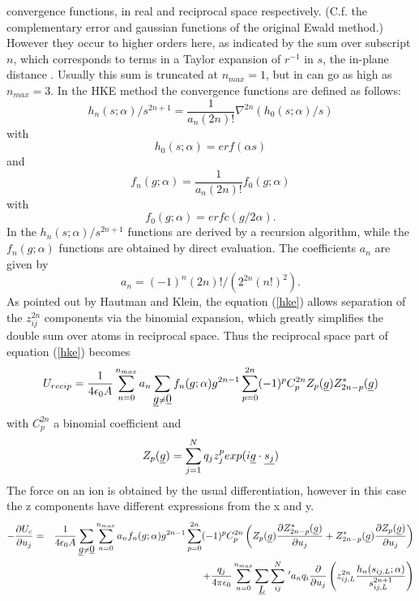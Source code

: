 convergence functions, in real and reciprocal space respectively.
(C.f. the complementary error and gaussian functions of the original
Ewald method.) However they occur to higher orders here, as indicated
by the sum over subscript $n$, which corresponds to terms in a Taylor
expansion of $r^{-1}$ in $s$, the in-plane distance
\cite{hautman-92a}. Usually this sum is truncated at $n_{max}=1$, but
in \D{} can go as high as $n_{max}=3$.  In the HKE method the
convergence functions are defined as follows:
\begin{equation}
h_{n}(s;\alpha)/s^{2n+1}=\frac{1}{a_{n}(2n)!}\nabla^{2n}(h_{0}(s;\alpha)/s)
\end{equation}
with 
\begin{equation}
h_{0}(s;\alpha)=erf(\alpha s)
\end{equation}
and
\begin{equation}
f_{n}(g;\alpha)=\frac{1}{a_{n}(2n)!}f_{0}(g;\alpha)
\end{equation}
with
\begin{equation}
f_{0}(g;\alpha)=erfc(g/2\alpha).
\end{equation}
In \D{} the $h_{n}(s;\alpha)/s^{2n+1}$ functions are derived by a
recursion algorithm, while the $f_{n}(g;\alpha)$ functions are
obtained by direct evaluation. The coefficients $a_{n}$ are given by
\begin{equation}
a_{n}=(-1)^{n}(2n)!/(2^{2n}(n!)^{2}).
\end{equation}
As pointed out by Hautman and Klein, the equation (\ref{hke}) allows
separation of the $z_{ij}^{2n}$ components via the binomial expansion,
which greatly simplifies the double sum over atoms
in reciprocal space. Thus the reciprocal space part of equation
(\ref{hke}) becomes
\begin{equation}
U_{recip}=\frac{1}{4\epsilon_{0}A}\sum_{n=0}^{n_{max}} a_{n}
\sum_{\mbox{$\underline{g}$}\ne \mbox{$\underline{0}$}} f_{n}(g;\alpha)g^{2n-1}
\sum_{p=0}^{2n}(-1)^{p}C_{p}^{2n}Z_{p}(\mbox{$\underline{g}$})Z_{2n-p}^{*}(\mbox{$\underline{g}$})
\end{equation}
with $C_{p}^{2n}$ a binomial coefficient and
\begin{equation}
Z_{p}(\mbox{$\underline{g}$})=\sum_{j=1}^{N}q_{j}z_{j}^{p}exp(i\mbox{$\underline{g}$}\cdot
\mbox{$\underline{s_{j}}$})
\end{equation}
The force on an ion is obtained by the usual differentiation, however
in this case the z components have different expressions from the x
and y.
\begin{eqnarray}
-\frac{\partial U_{c}}{\partial u_{j}} &=&
\frac{1}{4\epsilon_{0}A}\sum_{\mbox{$\underline{g}$}\ne \mbox{$\underline{0}$}} 
\sum_{n=0}^{n_{max}} a_{n}f_{n}(g;\alpha)g^{2n-1}
\sum_{p=0}^{2n}(-1)^{p}C_{p}^{2n}\left (
Z_{p}(\mbox{$\underline{g}$})\frac{\partial Z_{2n-p}^{*}(\mbox{$\underline{g}$})}{\partial u_{j}}+
Z_{2n-p}^{*}(\mbox{$\underline{g}$})\frac{\partial Z_{p}(\mbox{$\underline{g}$})}{\partial u_{j}}
\right ) \nonumber \\
 & & +\frac{q_{j}}{4\pi \epsilon_{0}}\sum_{n=0}^{n_{max}}\sum_{\mbox{$\underline{L}$}} \sum_{ij}^{N}\,^{\prime}a_{n}q_{i}
\frac{\partial}{\partial u_{j}}\left ( z_{ij,L}^{2n}
\frac{h_{n}(s_{ij,L};\alpha)}{s_{ij,L}^{2n+1}} \right )
\end{eqnarray}
